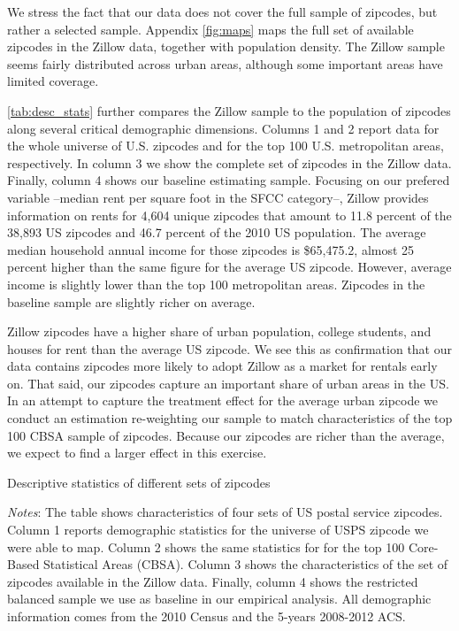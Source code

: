 We stress the fact that our data does not cover the full sample of zipcodes, but rather a 
selected sample. Appendix \autoref{fig:maps} maps the full set of available 
zipcodes in the Zillow data, together with population density. The Zillow sample seems 
fairly distributed across urban areas, although some important areas have limited coverage. 

\autoref{tab:desc_stats} further compares the Zillow sample to the population of zipcodes 
along several critical demographic dimensions. Columns 1 and 2 report data for the whole 
universe of U.S. zipcodes and for the top 100 U.S. metropolitan areas, respectively. In column 
3 we show the complete set of zipcodes in the Zillow data. Finally, column 4 shows our 
baseline estimating sample. Focusing on our prefered variable --median rent per square 
foot in the SFCC category--, Zillow provides information on rents for 4,604 unique zipcodes 
that amount to 11.8 percent of the 38,893 US zipcodes and 46.7 percent of the 2010 US 
population. The average median household annual income for those zipcodes is \$65,475.2, 
almost 25 percent higher than the same figure for the average US zipcode. However, average 
income is slightly lower than the top 100 metropolitan areas. Zipcodes in the baseline 
sample are slightly richer on average. 

Zillow zipcodes have a higher share of urban population, college students, and houses for 
rent than the average US zipcode. We see this as confirmation that our data 
contains zipcodes more likely to adopt Zillow as a market for rentals early on. That said, 
our zipcodes capture an important share of urban areas in the US. In an attempt to capture 
the treatment effect for the average urban zipcode we conduct an estimation re-weighting 
our sample to match characteristics of the top 100 CBSA sample of zipcodes. Because our 
zipcodes are richer than the average, we expect to find a larger effect in this exercise.

\begin{table}[h!]
	\caption{Descriptive statistics of different sets of zipcodes}
	\centering
	\label{tab:desc_stats}    
	
	\begin{minipage}{0.95\textwidth} \footnotesize
		\vspace{3mm} 
		\textit{Notes}: The table shows characteristics of four sets of US postal service 
		zipcodes. Column 1 reports demographic statistics for the universe of USPS zipcode we 
		were able to map. Column 2 shows the same statistics for for the top 100 Core-Based 
		Statistical Areas (CBSA). Column 3 shows the characteristics of the set of zipcodes 
		available in the Zillow data. Finally, column 4 shows the restricted balanced sample 
		we use as baseline in our empirical analysis. All demographic information comes from 
		the 2010 Census and the 5-years 2008-2012 ACS.
	\end{minipage}
\end{table}

